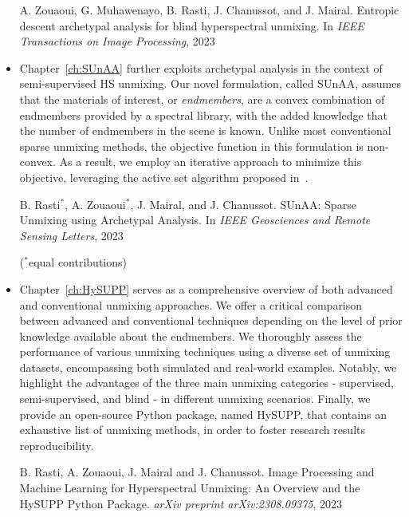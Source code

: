 \begin{itemize}
    \begin{tcolorbox}[colback=gray!5!white,colframe=gray!75!black]
        A. Zouaoui, G. Muhawenayo, B. Rasti, J. Chanussot, and J. Mairal. Entropic descent archetypal analysis for blind hyperspectral unmixing. In \emph{IEEE Transactions on Image Processing}, 2023
    \end{tcolorbox}


    \item Chapter~\ref{ch:SUnAA} further exploits archetypal analysis in the context of semi-supervised HS unmixing.
    Our novel formulation, called SUnAA, assumes that the materials of interest, or \emph{endmembers}, are a convex combination of endmembers provided by a spectral library, with the added knowledge that the number of endmembers in the scene is known.
    Unlike most conventional sparse unmixing methods, the objective function in this formulation is non-convex.
    As a result, we employ an iterative approach to minimize this objective, leveraging the active set algorithm proposed in~\cite{chen_fast_2014}.

    \begin{tcolorbox}[colback=gray!5!white,colframe=gray!75!black]
        B. Rasti$^{*}$, A. Zouaoui$^{*}$, J. Mairal, and J. Chanussot. SUnAA: Sparse Unmixing using Archetypal Analysis. In \emph{IEEE Geosciences and Remote Sensing Letters}, 2023

        \vspace{1em}

        ($^{*}$equal contributions)
    \end{tcolorbox}


    \item Chapter~\ref{ch:HySUPP} serves as a comprehensive overview of both advanced and conventional unmixing approaches.
    We offer a critical comparison between advanced and conventional techniques depending on the level of prior knowledge available about the endmembers.
    We thoroughly assess the performance of various unmixing techniques using a diverse set of unmixing datasets, encompassing both simulated and real-world examples.
    Notably, we highlight the advantages of the three main unmixing categories - supervised, semi-supervised, and blind - in different unmixing scenarios.
    Finally, we provide an open-source Python package, named HySUPP, that contains an exhaustive list of unmixing methods, in order to foster research results reproducibility.

    \begin{tcolorbox}[colback=gray!5!white,colframe=gray!75!black]
        B. Rasti, A. Zouaoui, J. Mairal and J. Chanussot. Image Processing and Machine Learning for Hyperspectral Unmixing: An Overview and the HySUPP Python Package. \emph{arXiv preprint arXiv:2308.09375}, 2023
    \end{tcolorbox}
    
\end{itemize}


